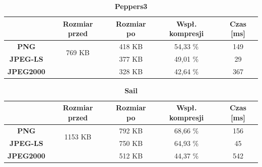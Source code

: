 \begin{table}[!h]
	\centering
	\caption{\textbf{Peppers3}}
	\label{my-label}
	\begin{tabular}{|c|c|c|c|c|}                                             
		\hline
		& \textbf{Rozmiar przed} & \textbf{Rozmiar po} & \textbf{Wspł. kompresji} & \textbf{Czas {[}ms{]}} \\ \hline 
		\textbf{PNG}      &          \multicolumn{1}{c|}{\multirow{2}{*}{769 KB}}             &         418 KB            &        54,33 \%                  &         149                    \\\cline{3-5}
		\textbf{JPEG-LS}  &                        &          377 KB           &         49,01 \%                 &          29                \\\cline{3-5}
		\textbf{JPEG2000} &                        &        328 KB             &      42,64 \%                    &      367                \\ \hline
	\end{tabular}
\end{table}

\begin{table}[!h]
	\centering
	\caption{\textbf{Sail}}
	\label{my-label}
	\begin{tabular}{|c|c|c|c|c|}                                             
		\hline
		& \textbf{Rozmiar przed} & \textbf{Rozmiar po} & \textbf{Wspł. kompresji} & \textbf{Czas {[}ms{]}} \\ \hline 
		\textbf{PNG}      &          \multicolumn{1}{c|}{\multirow{2}{*}{1153 KB}}             &       792 KB              &         68,66 \%                 &           156                  \\\cline{3-5}
		\textbf{JPEG-LS}  &                        &        750  KB           &         64,93 \%                &          45                \\\cline{3-5}
		\textbf{JPEG2000} &                        &        512 KB             &      44,37 \%                   &      542                \\ \hline
	\end{tabular}
\end{table}

